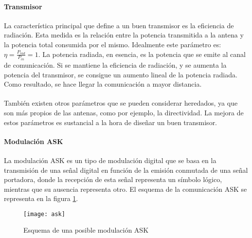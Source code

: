 \paragraph{Transmisor}
\paragraph{}
La característica principal que define a un buen transmisor es la eficiencia de radiación. Esta medida es la relación entre la potencia transmitida a la antena y la potencia total consumida por el mismo. Idealmente este parámetro es: $\eta = \frac{P_{rad}}{P_{in}} = 1$. La potencia radiada, en esencia, es la potencia que se emite al canal de comunicación. Si se mantiene la eficiencia de radiación, y se aumenta la potencia del transmisor, se consigue un aumento lineal de la potencia radiada. Como resultado, se hace llegar la comunicación a mayor distancia. 
\paragraph{}
También existen otros parámetros que se pueden considerar heredados, ya que son más propios de las antenas, como por ejemplo, la directividad. La mejora de estos parámetros es sustancial a la hora de diseñar un buen transmisor.

\paragraph{Modulación ASK}
\paragraph{}
La modulación ASK es un tipo de modulación digital que se basa en la transmisión de una señal digital en función de la emisión conmutada de una señal portadora, donde la recepción de esta señal representa un símbolo lógico, mientras que su ausencia representa otro.
El esquema de la comunicación ASK se representa en la figura \ref{fig:ask}.

\begin{figure}[h]
    \centering
    \texttt{[image: ask]}
    \caption{Esquema de una posible modulaci\'on ASK}
    \label{fig:ask}
\end{figure}
\paragraph{}
